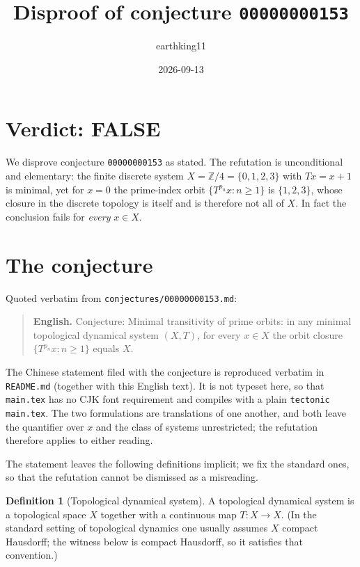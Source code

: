 \documentclass[11pt]{article}
\title{Disproof of conjecture \texttt{00000000153}}
\author{earthking11}
\date{2026-09-13}
\theoremstyle{definition}
\newtheorem{definition}[theorem]{Definition}
\theoremstyle{remark}
\newcommand{\Z}{\mathbb{Z}}
\begin{document}
\maketitle

\section*{Verdict: FALSE}

We disprove conjecture \texttt{00000000153} as stated. The refutation is
unconditional and elementary: the finite discrete system
$X = \Z/4 = \{0,1,2,3\}$ with $Tx = x+1$ is minimal, yet for $x = 0$ the
prime-index orbit $\{T^{p_n}x : n \ge 1\}$ is $\{1,2,3\}$, whose closure in the
discrete topology is itself and is therefore not all of $X$. In fact the
conclusion fails for \emph{every} $x \in X$.

\section{The conjecture}

Quoted verbatim from \texttt{conjectures/00000000153.md}:

\begin{quote}
\textbf{English.} Conjecture: Minimal transitivity of prime orbits: in any
minimal topological dynamical system $(X, T)$, for every $x \in X$ the orbit
closure $\{T^{p_n}x : n \ge 1\}$ equals $X$.
\end{quote}

\noindent The Chinese statement filed with the conjecture is reproduced
verbatim in \texttt{README.md} (together with this English text). It is not
typeset here, so that \texttt{main.tex} has no CJK font requirement and
compiles with a plain \texttt{tectonic main.tex}. The two formulations are
translations of one another, and both leave the quantifier over $x$ and the
class of systems unrestricted; the refutation therefore applies to either
reading.

The statement leaves the following definitions implicit; we fix the standard
ones, so that the refutation cannot be dismissed as a misreading.

\begin{definition}[Topological dynamical system]
A topological dynamical system is a topological space $X$ together with a
continuous map $T : X \to X$. (In the standard setting of topological dynamics
one usually assumes $X$ compact Hausdorff; the witness below is compact
Hausdorff, so it satisfies that convention.)
\end{definition}
\end{document}
